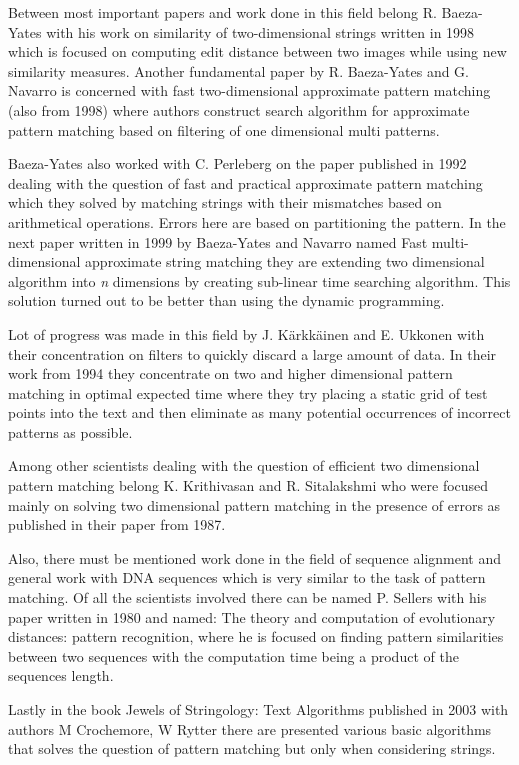 Between most important papers and work done in this field belong R. Baeza-Yates with his work on similarity of two-dimensional strings written in 1998 which is focused on computing edit distance between two images while using new similarity measures. Another fundamental paper by R. Baeza-Yates and G. Navarro is concerned with fast two-dimensional approximate pattern matching (also from 1998) where authors construct search algorithm for approximate pattern matching based on filtering of one dimensional multi patterns.

Baeza-Yates also worked with C. Perleberg on the paper published in 1992 dealing with the question of fast and practical approximate pattern matching which they solved by matching strings with their mismatches based on arithmetical operations. Errors here are based on partitioning the pattern. In the next paper written in 1999 by Baeza-Yates and Navarro named Fast multi-dimensional approximate string matching they are extending two dimensional algorithm into \textit{n} dimensions by creating sub-linear time searching algorithm. This solution turned out to be better than using the dynamic programming.

Lot of progress was made in this field by J. K{\" a}rkk{\" a}inen and E. Ukkonen with their concentration on filters to quickly discard a large amount of data. In their work from 1994 they concentrate on two and higher dimensional pattern matching in optimal expected time where they try placing a static grid of test points into the text and then eliminate as many potential occurrences of incorrect patterns as possible.

Among other scientists dealing with the question of efficient two dimensional pattern matching belong K. Krithivasan and R. Sitalakshmi who were focused mainly on solving two dimensional pattern matching in the presence of errors as published in their paper from 1987.

Also, there must be mentioned work done in the field of sequence alignment and general work with DNA sequences which is very similar to the task of pattern matching. Of all the scientists involved there can be named P. Sellers with his paper written in 1980 and named: The theory and computation of evolutionary distances: pattern recognition, where he is focused on finding pattern similarities between two sequences with the computation time being a product of the sequences length.

Lastly in the book Jewels of Stringology: Text Algorithms published in 2003 with authors M Crochemore, W Rytter there are presented various basic algorithms that solves the question of pattern matching but only when considering strings.

